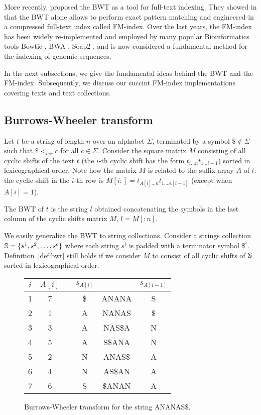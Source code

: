 More recently, \citeauthor{Ferragina2000} proposed the BWT as a tool for full-text indexing.
They showed in \citep{Ferragina2000} that the BWT alone allows to perform exact pattern matching and engineered in \citep{Ferragina2001} a compressed full-text index called FM-index.
Over the last years, the FM-index has been widely re-implemented and employed by many popular Bioinformatics tools \eg Bowtie \citep{Bowtie}, BWA \citep{BWA}, Soap2 \citep{Soap2}, and is now considered a fundamental method for the indexing of genomic sequences.

In the next subsections, we give the fundamental ideas behind the BWT and the FM-index.
Subsequently, we discuss our succint FM-index implementations covering texts and text collections.

\subsection{Burrows-Wheeler transform}

Let $t$ be a string of length $n$ over an alphabet $\Sigma$, terminated by a symbol $\$ \notin \Sigma$ such that $\$ <_{lex} c$ for all $c \in \Sigma$.
Consider the square matrix $M$ consisting of all cyclic shifts of the text $t$ (the $i$-th cyclic shift has the form $t_{i \dots n} t_{1 \dots i-1}$) sorted in lexicographical order.
Note how the matrix $M$ is related to the suffix array $A$ of $t$: the cyclic shift in the $i$-th row is $M[i:] = t_{A[i] \dots n} t_{1 \dots A[i-1]}$ (except when $A[i] = 1$).

\begin{definition}
\label{def:bwt}
The BWT of $t$ is the string $l$ obtained concatenating the symbols in the last column of the cyclic shifts matrix $M$, \ie $l = M[:n]$.
\end{definition}

We easily generalize the BWT to string collections.
Consider a strings collection $\mathbb {S} = \{ s^1, s^2, \dots, s^c \}$ where each string $s^i$ is padded with a terminator symbol $\$^i$.
Definition~\ref{def:bwt} still holds if we consider $M$ to consist of all cyclic shifts of $\mathbb {S}$ sorted in lexicographical order.

\begin{figure}[h]
\begin{center}
\caption{Burrows-Wheeler transform for the string {\ttfamily ANANAS\$}.}
\label{fig:bwt}
\small
\ttfamily
\begin{tabular}{cccccc}
$i$ & $A[i]$ & \phantom{-} & $s_{A[i]}$ & & $s_{A[i-1]}$\\
\midrule
1 & 7 & & \$& ANANA  & S\\
2 & 1 & & A & NANAS  & \$\\
3 & 3 & & A & NAS\$A & N\\
4 & 5 & & A & S\$ANA & N\\
5 & 2 & & N & ANAS\$ & A\\
6 & 4 & & N & AS\$AN & A\\
7 & 6 & & S & \$ANAN & A\\
\end{tabular}
\end{center}
\end{figure}

